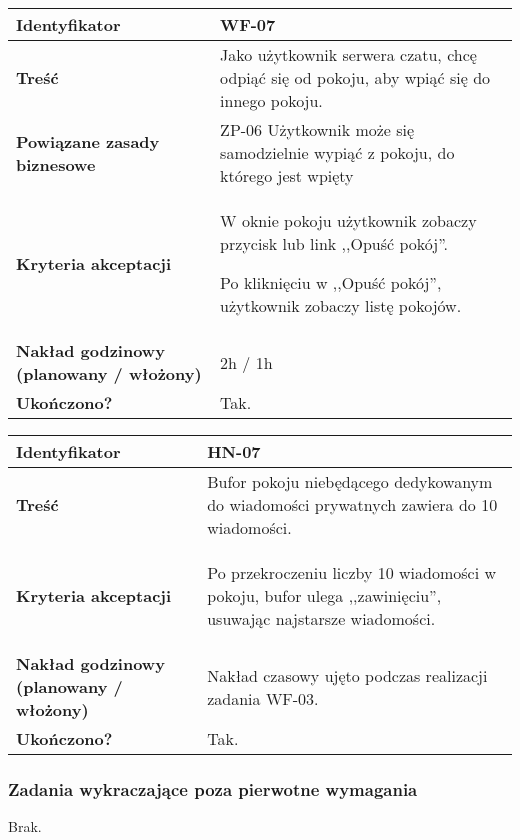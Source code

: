 \begin{tabular}{ | l | l | }
 \hline
   \textbf{Identyfikator} &
   WF-07
   \\

 \hline
   \textbf{Treść} & \parbox[t]{11.5cm}{\strut
     Jako użytkownik serwera czatu, chcę odpiąć się od pokoju,
     aby wpiąć się do innego pokoju.
   \strut}\\

 \hline
   \parbox[t]{4cm}{\textbf{Powiązane zasady biznesowe}} & \parbox[t]{11.5cm}{\strut
     ZP-06 Użytkownik może się samodzielnie wypiąć z pokoju,
     do którego jest wpięty

   \strut}\\

 \hline
   \parbox[t]{4cm}{\textbf{Kryteria akceptacji}} & \parbox[t]{11.5cm}{\strut
     \begin{enumreq}
       \item W oknie pokoju użytkownik zobaczy przycisk
       lub link ,,Opuść pokój''.
       \item Po kliknięciu w ,,Opuść pokój'', użytkownik
       zobaczy listę pokojów.
     \end{enumreq}
     \strut}
   \\

   \hline
     \parbox[t]{4cm}{\textbf{Nakład godzinowy (planowany / włożony)}} &
     \parbox[t]{11.5cm}{\strut
       2h / 1h
     \strut}\\

     \hline
       \parbox[t]{4cm}{\textbf{Ukończono?}} &
       \parbox[t]{11.5cm}{\strut
         Tak.
       \strut}\\
 \hline
\end{tabular}

\vspace{1em}

\begin{tabular}{ | l | l | }
	\hline
		\textbf{Identyfikator} &
		HN-07
		\\

	\hline
		\textbf{Treść} & \parbox[t]{11.5cm}{\strut
			Bufor pokoju niebędącego dedykowanym do wiadomości prywatnych zawiera do
      10 wiadomości.
		\strut}\\

	\hline
		\parbox[t]{4cm}{\textbf{Kryteria akceptacji}} & \parbox[t]{11.5cm}{\strut
			\begin{enumreq}
				\item Po przekroczeniu liczby 10 wiadomości w pokoju, bufor ulega
        ,,zawinięciu'', usuwając najstarsze wiadomości.
			\end{enumreq}
			\strut}
		\\
    \hline
      \parbox[t]{4cm}{\textbf{Nakład godzinowy (planowany / włożony)}} &
      \parbox[t]{11.5cm}{\strut
        Nakład czasowy ujęto podczas realizacji zadania WF-03.
      \strut}\\

      \hline
        \parbox[t]{4cm}{\textbf{Ukończono?}} &
        \parbox[t]{11.5cm}{\strut
          Tak.
        \strut}\\

	\hline
\end{tabular}

\subsubsection{Zadania wykraczające poza pierwotne wymagania}

Brak.
